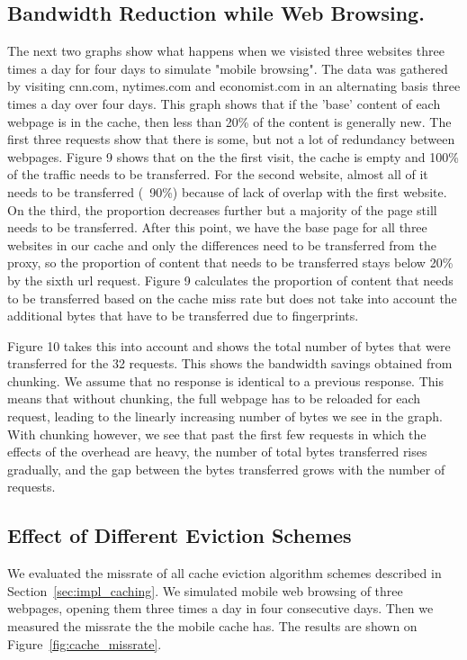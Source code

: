 \subsection{Bandwidth Reduction while Web Browsing.}
The next two graphs show what happens when we visisted three websites three times a day for four days to simulate "mobile browsing". 
The data was gathered by visiting cnn.com, nytimes.com and economist.com in an alternating basis three times a day over four days. This graph shows that if the 'base' content of each webpage is in the cache, then less than 20\% of the content is generally new. The first three requests show that there is some, but not a lot of redundancy between webpages.
Figure 9 shows that on the the first visit, the cache is empty and 100\% of the traffic needs to be transferred. 
For the second website, almost all of it needs to be transferred (~90\%) because of lack of overlap with the first website. 
On the third, the proportion decreases further but a majority of the page still needs to be transferred. 
After this point, we have the base page for all three websites in our cache and only the differences need to be transferred from the proxy, so the proportion of content that needs to be transferred stays below 20\% by the sixth url request. 
Figure 9 calculates the proportion of content that needs to be transferred based on the cache miss rate but does not take into account the additional bytes that have to be transferred due to fingerprints.

Figure 10 takes this into account and shows the total number of bytes that were transferred for the 32 requests. This shows the bandwidth savings obtained from chunking.
We assume that no response is identical to a previous response. 
This means that without chunking, the full webpage has to be reloaded for each request, leading to the linearly increasing number of bytes we see in the graph. 
With chunking however, we see that past the first few requests in which the effects of the overhead are heavy, the number of total bytes transferred rises gradually, and the gap between the bytes transferred grows with the number of requests.

\subsection{Effect of Different Eviction Schemes}
We evaluated the missrate of  all cache eviction algorithm schemes described in Section~\ref{sec:impl_caching}. We
simulated mobile web browsing of three webpages, opening them three times a day in four consecutive days. Then we
measured the missrate the the mobile cache has. The results are shown on Figure~\ref{fig:cache_missrate}.

